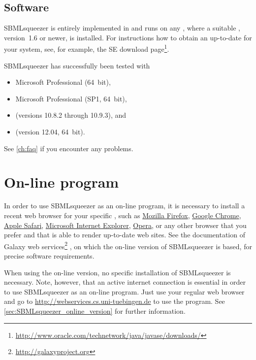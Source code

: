 \subsection{Software}\label{sec:SoftwareRequirements}

SBMLsqueezer is entirely implemented in \Java and runs on any \OS, where a 
suitable \JVM, \JDK version~1.6 or newer, is installed.
For instructions how to obtain an up-to-date \JVM for your system, see, for 
example, the \Java SE download
page\footnote{\url{http://www.oracle.com/technetwork/java/javase/downloads/}\label{fn:jvmldl}}.

SBMLsqueezer has successfully been tested with
\begin{itemize}
  \item Microsoft \WindowsSeven Professional (64~bit),
  \item Microsoft \WindowsSeven Professional (SP1, 64~bit),
  \item \MacOSX (versions 10.8.2 through 10.9.3), and
  \item \UbuntuLinux (version 12.04, 64~bit).
\end{itemize}
See \vref{ch:faq} if you encounter any problems.

\section{On-line program}
\label{sec:WebserviceInstallation}

In order to use SBMLsqueezer as an on-line program, it is necessary to install a recent web browser for your specific \OS, such as \href{http://www.mozilla.org}{Mozilla Firefox}, \href{https://www.google.com/intl/en/chrome/browser/}{Google Chrome}, \href{https://www.apple.com/safari/}{Apple Safari}, \href{http://windows.microsoft.com/en-us/internet-explorer/download-ie}{Microsoft Internet Explorer}, \href{http://www.opera.com/}{Opera}, or any other browser that you prefer and that is able to render up-to-date web sites.
See the documentation of Galaxy web services\footnote{\url{http://galaxyproject.org}} \citep{Goecks2010}, on which the on-line version of SBMLsqueezer is based, for precise software requirements.

When using the on-line version, no specific installation of SBMLsqueezer is necessary.
Note, however, that an active internet connection is essential in order to use SBMLsqueezer as an on-line program.
Just use your regular web browser and go to \url{http://webservices.cs.uni-tuebingen.de} to use the program.
See \vref{sec:SBMLsqueezer_online_version} for further information.


